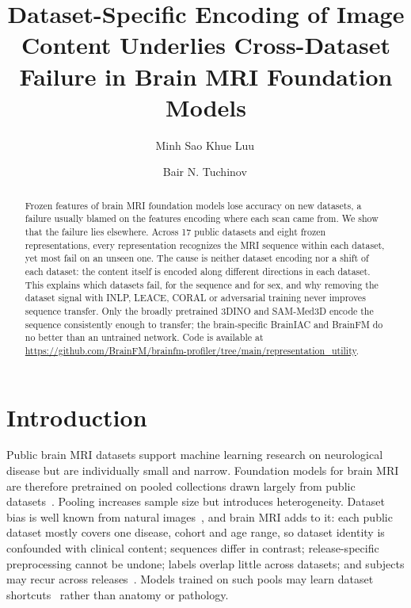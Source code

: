 \documentclass[11pt]{article}
\title{Dataset-Specific Encoding of Image Content Underlies Cross-Dataset Failure in Brain MRI Foundation Models}
\author[1]{Minh Sao Khue Luu\,\orcidlink{0000-0002-6766-4966}}
\author[1]{Bair N. Tuchinov\,\orcidlink{0000-0002-8931-9848}}
\affil[1]{The Artificial Intelligence Research Center of Novosibirsk State University, Novosibirsk 630090, Russia}
\affil[ ]{\texttt{luumsk@gmail.com}}
\date{}
\begin{document}
\maketitle

\begin{abstract}
Frozen features of brain MRI foundation models lose accuracy on new datasets,
a failure usually blamed on the features encoding where each scan came from.
We show that the failure lies elsewhere. Across 17 public datasets and eight
frozen representations, every representation recognizes the MRI sequence
within each dataset, yet most fail on an unseen one. The cause is neither
dataset encoding nor a shift of each dataset: the content itself is encoded
along different directions in each dataset. This explains which datasets
fail, for the sequence and for sex, and why removing the dataset signal with
INLP, LEACE, CORAL or adversarial training never improves sequence transfer.
Only the broadly pretrained 3DINO and SAM-Med3D encode the sequence
consistently enough to transfer; the brain-specific BrainIAC and BrainFM do
no better than an untrained network.
Code is available at
\url{https://github.com/BrainFM/brainfm-profiler/tree/main/representation_utility}.
\end{abstract}

\section{Introduction}

Public brain MRI datasets support machine learning research on neurological
disease but are individually small and narrow. Foundation models for brain
MRI are therefore pretrained on pooled collections drawn largely from public
datasets~\cite{munk_large-scale_2025, tak_generalizable_2026,
liu_modality-agnostic_2025}. Pooling increases sample size but introduces
heterogeneity. Dataset bias is well known from natural
images~\cite{torralba_unbiased_2011}, and brain MRI adds to it: each public
dataset mostly covers one disease, cohort and age range, so dataset identity
is confounded with clinical content; sequences differ in contrast;
release-specific preprocessing cannot be undone; labels overlap little across
datasets; and subjects may recur across releases~\cite{jimenez-sanchez_copycats_2024}.
Models trained on such pools may learn dataset shortcuts~\cite{geirhos_shortcut_2020,
zech_variable_2018} rather than anatomy or pathology.
\end{document}
